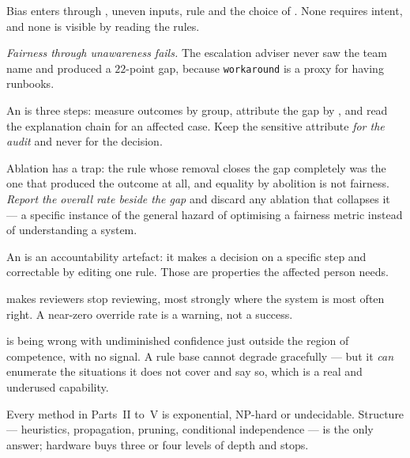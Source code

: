 \begin{chaptersummary}
\begin{tight}
  \item Bias enters through , uneven inputs, rule
         and the choice of . None requires intent,
        and none is visible by reading the rules.
  \item \emph{Fairness through unawareness fails.} The escalation adviser never saw
        the team name and produced a $22$-point gap, because
        \texttt{workaround} is a proxy for having runbooks.
  \item An  is three steps: measure outcomes by group, attribute the gap
        by , and read the explanation chain for an affected case.
        Keep the sensitive attribute \emph{for the audit} and never for the
        decision.
  \item Ablation has a trap: the rule whose removal closes the gap completely was
        the one that produced the outcome at all, and equality by abolition is not
        fairness. \emph{Report the overall rate beside the gap} and discard any
        ablation that collapses it --- a specific instance of the general hazard of
        optimising a fairness metric instead of understanding a system.
  \item An  is an accountability artefact: it makes a decision
         on a specific step and correctable by editing one rule.
        Those are properties the affected person needs.
  \item {} makes reviewers stop reviewing, most strongly where
        the system is most often right. A near-zero override rate is a warning, not
        a success.
  \item {} is being wrong with undiminished confidence just outside
        the region of competence, with no signal. A rule base cannot degrade
        gracefully --- but it \emph{can} enumerate the situations it does not cover
        and say so, which is a real and underused capability.
  \item Every method in Parts~II to~V is exponential, NP-hard or undecidable.
        Structure --- heuristics, propagation, pruning, conditional independence ---
        is the only answer; hardware buys three or four levels of depth and stops.
\end{tight}
\end{chaptersummary}

